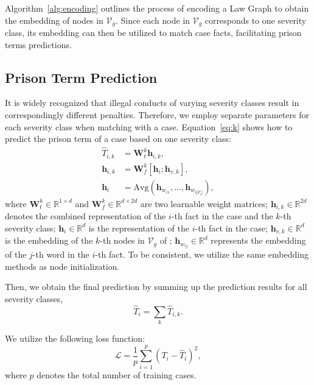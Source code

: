 Algorithm~\ref{alg:encoding} outlines the process of encoding a Law Graph to obtain the embedding of nodes in $\mathcal{V}_g$. Since each node in $\mathcal{V}_g$ corresponds to one severity class, its embedding can then be utilized to match case facts, facilitating prison terms predictions.

\subsection{Prison Term Prediction} \label{ee}
It is widely recognized that illegal conducts of varying severity classes result in correspondingly different penalties. Therefore, we employ separate parameters for each severity class when matching with a case. Equation~\ref{eq:k} shows how to predict the prison term of a case based on one severity class:
\begin{align}
\hat{T}_{i,k} &= \textbf{W}^{k}_{t}\mathbf{h}_{i,k}, \label{eq:k} \\
\mathbf{h}_{i,k} &= \textbf{W}^{k}_{f}\left[\mathbf{h}_i; \mathbf{h}_{v,k}\right], \\
\mathbf{h}_i &= \text{Avg}({\mathbf{h}_{w_{i1}},\ldots,\mathbf{h}_{w_{i|F_i|}}}),
\end{align}
\noindent where $\textbf{W}^{k}_{t} \in \mathbb{R}^{1\times d}$ and $\textbf{W}^{k}_{f} \in \mathbb{R}^{d\times 2d}$ are two learnable weight matrices; $\mathbf{h}_{i,k} \in \mathbb{R}^{2d}$ denotes the combined representation of the $i$-th fact in the case and the $k$-th severity class; $\mathbf{h}_i \in \mathbb{R}^{d}$ is the representation of the $i$-th fact in the case; $\mathbf{h}_{v,k} \in \mathbb{R}^{d}$ is the embedding of the $k$-th nodes in $\mathcal{V}_g$ of \lawgraph{}; $\mathbf{h}_{w_{ij}} \in \mathbb{R}^{d}$ represents the embedding of the $j$-th word in the $i$-th fact. To be consistent, we utilize the same embedding methods as node initialization.

Then, we obtain the final prediction by summing up the prediction results for all severity classes,
\begin{equation}
\hat{T}_{i} = \sum_{k}\hat{T}_{i,k}.
\label{eq:f}
\end{equation}

We utilize the following loss function:
\begin{equation}
\mathcal{L} = \frac{1}{p}\sum_{i=1}^{p}(T_{i}-\hat{T}_{i})^2,
\label{eq:loss}
\end{equation}
\noindent where $p$ denotes the total number of training cases. 

